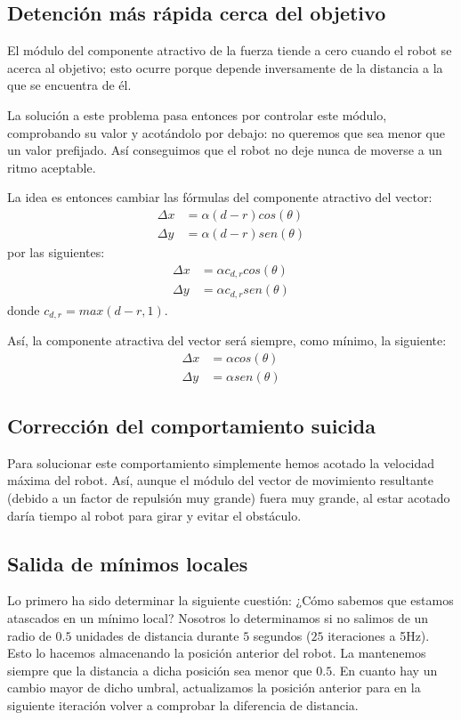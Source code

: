 \documentclass[a4paper, 11pt, titlepage]{article}
\begin{document}
  \subsection{Detención más rápida cerca del objetivo}
    El módulo del componente atractivo de la fuerza tiende a cero cuando el robot se acerca al objetivo; esto ocurre porque depende inversamente de la distancia a la que se encuentra de él.

    La solución a este problema pasa entonces por controlar este módulo, comprobando su valor y acotándolo por debajo: no queremos que sea menor que un valor prefijado. Así conseguimos que el robot no deje nunca de moverse a un ritmo aceptable.

    La idea es entonces cambiar las fórmulas del componente atractivo del vector:
    \begin{align*}
        \Delta x &= \alpha (d-r) cos(\theta) \\
        \Delta y &= \alpha (d-r) sen(\theta)
    \end{align*}
    por las siguientes:
    \begin{align*}
        \Delta x &= \alpha c_{d,r} cos(\theta) \\
        \Delta y &= \alpha c_{d,r} sen(\theta)
    \end{align*}
    donde $c_{d,r} = max(d-r, 1)$.

    Así, la componente atractiva del vector será siempre, como mínimo, la siguiente:
    \begin{align*}
        \Delta x &= \alpha cos(\theta) \\
        \Delta y &= \alpha sen(\theta)
    \end{align*}


  \subsection{Corrección del comportamiento suicida}
    Para solucionar este comportamiento simplemente hemos acotado la velocidad máxima del robot. Así, aunque el módulo del vector de movimiento resultante (debido a un factor de repulsión muy grande) fuera muy grande, al estar acotado daría tiempo al robot para girar y evitar el obstáculo.

  \subsection{Salida de mínimos locales}
    Lo primero ha sido determinar la siguiente cuestión: ¿Cómo sabemos que estamos atascados en un mínimo local? Nosotros lo determinamos si no salimos de un radio de $0.5$ unidades de distancia durante $5$ segundos ($25$ iteraciones a 5Hz). Esto lo hacemos almacenando la posición anterior del robot. La mantenemos siempre que la distancia a dicha posición sea menor que $0.5$. En cuanto hay un cambio mayor de dicho umbral, actualizamos la posición anterior para en la siguiente iteración volver a comprobar la diferencia de distancia.
\end{document}
